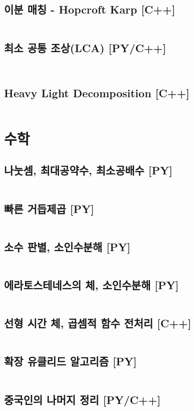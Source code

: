 \documentclass[landscape,8pt,a4paper,twocolumn]{extarticle}
\begin{document}
\subsection{이분 매칭 - Hopcroft Karp [C++]}
\inputminted{cpp}{mixed/cpp/Graph2/Hopcroft.hpp}
\subsection{최소 공통 조상(LCA) [PY/C++]}
\inputminted{python}{python/Graph2/LCA.py}
\inputminted{cpp}{mixed/cpp/Graph2/LCA.hpp}
\subsection{Heavy Light Decomposition [C++]}
\inputminted{cpp}{mixed/cpp/Graph2/HLD.hpp}
\section{수학}
\subsection{나눗셈, 최대공약수, 최소공배수 [PY]}
\inputminted{python}{python/Math/Division.py}
\subsection{빠른 거듭제곱 [PY]}
\inputminted{python}{python/Math/PowMod.py}
\subsection{소수 판별, 소인수분해 [PY]}
\inputminted{python}{python/Math/Primes.py}
\subsection{에라토스테네스의 체, 소인수분해 [PY]}
\inputminted{python}{python/Math/Sieve.py}
\subsection{선형 시간 체, 곱셈적 함수 전처리 [C++]}
\inputminted{cpp}{mixed/cpp/Math/LinearSieve.hpp}
\subsection{확장 유클리드 알고리즘 [PY]}
\inputminted{python}{python/Math/ExtendedEuclidean.py}
\subsection{중국인의 나머지 정리 [PY/C++]}
\inputminted{python}{python/Math/ChineseRemainderTheorem.py}
\inputminted{cpp}{mixed/cpp/Math/ChineseRemainderTheorem.hpp}
\end{document}

